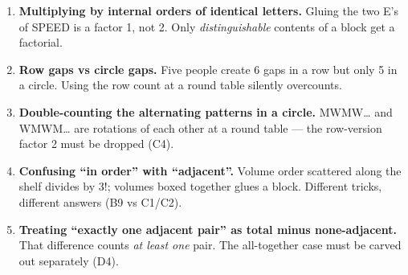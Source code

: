 \documentclass[11pt,a4paper]{article}
\begin{document}
\begin{enumerate}[leftmargin=2em, itemsep=4pt]
  \item \textbf{Multiplying by internal orders of identical letters.} Gluing the two E's of SPEED is a factor 1, not 2. Only \emph{distinguishable} contents of a block get a factorial. 
  \item \textbf{Row gaps vs circle gaps.} Five people create 6 gaps in a row but only 5 in a circle. Using the row count at a round table silently overcounts. 
  \item \textbf{Double-counting the alternating patterns in a circle.} MWMW\ldots{} and WMWM\ldots{} are rotations of each other at a round table --- the row-version factor 2 must be dropped (C4). 
  \item \textbf{Confusing ``in order'' with ``adjacent''.} Volume order scattered along the shelf divides by $3!$; volumes boxed together glues a block. Different tricks, different answers (B9 vs C1/C2). 
  \item \textbf{Treating ``exactly one adjacent pair'' as total minus none-adjacent.} That difference counts \emph{at least one} pair. The all-together case must be carved out separately (D4). 
\end{enumerate}

\end{document}
